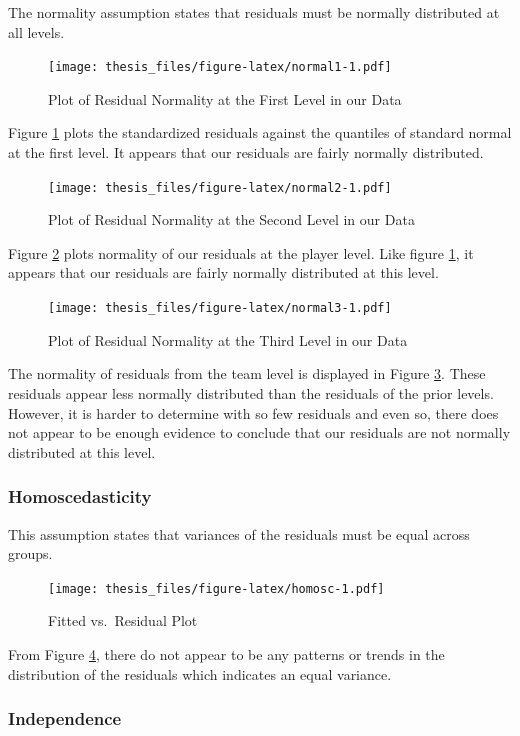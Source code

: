 \documentclass[12pt,twoside]{reedthesis}
\begin{document}
The normality assumption states that residuals must be normally
distributed at all levels.
\begin{figure}
\centering
\texttt{[image: thesis\_files/figure-latex/normal1-1.pdf]}
\caption{\label{fig:normal1}Plot of Residual Normality at the First Level in
our Data}
\end{figure}
Figure \ref{fig:normal1} plots the standardized residuals against the
quantiles of standard normal at the first level. It appears that our
residuals are fairly normally distributed.
\begin{figure}
\centering
\texttt{[image: thesis\_files/figure-latex/normal2-1.pdf]}
\caption{\label{fig:normal2}Plot of Residual Normality at the Second Level
in our Data}
\end{figure}
Figure \ref{fig:normal2} plots normality of our residuals at the player
level. Like figure \ref{fig:normal1}, it appears that our residuals are
fairly normally distributed at this level.
\begin{figure}
\centering
\texttt{[image: thesis\_files/figure-latex/normal3-1.pdf]}
\caption{\label{fig:normal3}Plot of Residual Normality at the Third Level in
our Data}
\end{figure}
The normality of residuals from the team level is displayed in Figure
\ref{fig:normal3}. These residuals appear less normally distributed than
the residuals of the prior levels. However, it is harder to determine
with so few residuals and even so, there does not appear to be enough
evidence to conclude that our residuals are not normally distributed at
this level.

\subsubsection{Homoscedasticity}\label{homoscedasticity}

This assumption states that variances of the residuals must be equal
across groups.
\begin{figure}
\centering
\texttt{[image: thesis\_files/figure-latex/homosc-1.pdf]}
\caption{\label{fig:homosc}Fitted vs.~Residual Plot}
\end{figure}
From Figure \ref{fig:homosc}, there do not appear to be any patterns or
trends in the distribution of the residuals which indicates an equal
variance.

\subsubsection{Independence}\label{independence}
\end{document}
